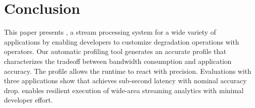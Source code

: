 \vspace{-1em}
\section{Conclusion}
\label{sec:conclusion}


This paper presents \sysname{}, a stream processing system for a wide variety of
applications by enabling developers to customize degradation operations with
\maybe{} operators. Our automatic profiling tool generates an accurate profile
that characterizes the tradeoff between bandwidth consumption and application
accuracy. The profile allows the runtime to react with precision. Evaluations
with three applications show that \sysname{} achieves sub-second latency with
nominal accuracy drop. \sysname{} enables resilient execution of wide-area
streaming analytics with minimal developer effort.

